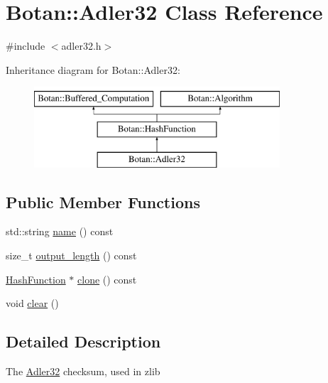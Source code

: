 \hypertarget{classBotan_1_1Adler32}{\section{Botan\-:\-:Adler32 Class Reference}
\label{classBotan_1_1Adler32}
}


{\ttfamily \#include $<$adler32.\-h$>$}

Inheritance diagram for Botan\-:\-:Adler32\-:\begin{figure}[H]
\begin{center}
\leavevmode
\includegraphics[height=3.000000cm]{classBotan_1_1Adler32}
\end{center}
\end{figure}
\subsection*{Public Member Functions}
\begin{DoxyCompactItemize}
\item 
std\-::string \hyperlink{classBotan_1_1Adler32_a76254c534a9eeb8f28e305d29cf1cd4f}{name} () const 
\item 
size\-\_\-t \hyperlink{classBotan_1_1Adler32_a6d33f092cf76f4f08dd694df8bf23908}{output\-\_\-length} () const 
\item 
\hyperlink{classBotan_1_1HashFunction}{Hash\-Function} $\ast$ \hyperlink{classBotan_1_1Adler32_a3c3799b5023207d8e32bb416e06e1990}{clone} () const 
\item 
void \hyperlink{classBotan_1_1Adler32_a88aceb430372fff5312db500c7f54bce}{clear} ()
\end{DoxyCompactItemize}


\subsection{Detailed Description}
The \hyperlink{classBotan_1_1Adler32}{Adler32} checksum, used in zlib 


